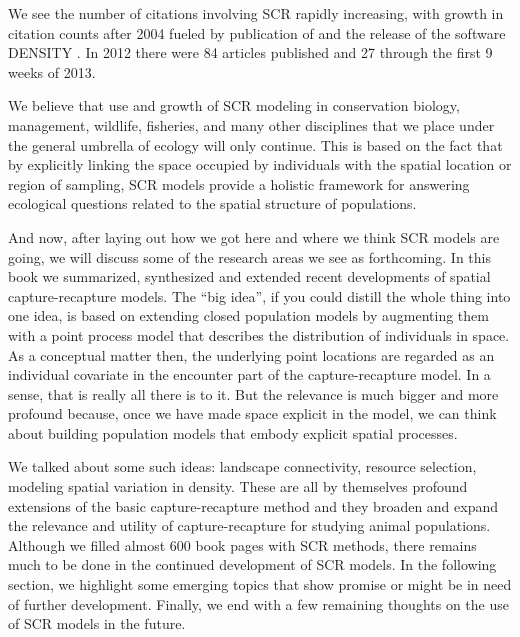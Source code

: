 We see the number of citations involving SCR rapidly increasing,
with growth in citation counts after 2004 fueled by publication of
\citet{efford:2004} and the release of the software DENSITY
\citep{efford_etal:2004}. In 2012 there were 84 articles published and
27 through the first 9 weeks of 2013.

We believe that use and growth of SCR modeling in conservation biology,
management, wildlife, fisheries, and many other disciplines that we place under
the general umbrella of ecology will only continue.
This is based on the fact that by explicitly linking the space occupied by individuals with the
spatial location or region of sampling, SCR models
provide a holistic framework for answering ecological questions
related to the spatial structure of populations. %

And now, after laying out how we got here and where we think SCR models are
going, we will discuss some of the research areas we see as forthcoming.
In this book we summarized, synthesized and extended recent
developments of spatial capture-recapture models. The ``big idea'',
if you could distill the whole thing into one idea, is based on
extending closed population models by augmenting them with a point
process model that describes the distribution of individuals
\citep{efford:2004} in space. As a conceptual matter then, the
underlying point locations are regarded as an individual covariate in
the encounter part of the capture-recapture model. In a sense, that is
really all there is to it. But the relevance is much bigger and more
profound because, once we have made space explicit in the model,
we can think about building population models that embody explicit
spatial processes.

We talked about some such ideas: landscape connectivity, resource
selection, modeling spatial variation in density. These are all by
themselves profound extensions of the basic capture-recapture method
and they broaden and expand the relevance and utility of
capture-recapture for studying animal populations.
Although we filled almost 600 book pages with SCR methods,
there remains much to be done in the continued development of SCR
models. In the following section, we highlight some emerging topics that show promise or might be in
need of further development. Finally, we end with a few remaining
thoughts on the use of SCR models in the future.



